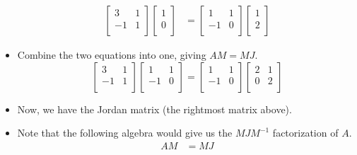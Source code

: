 \documentclass{article}
\begin{document}
\begin{itemize}
\begin{align*}
        \begin{bmatrix}
            3 & 1\\
            -1 & 1\\
        \end{bmatrix}
        \begin{bmatrix}
            1\\
            0\\
        \end{bmatrix}
        &=
        \begin{bmatrix}
            1 & 1\\
            -1 & 0\\
        \end{bmatrix}
        \begin{bmatrix}
            1\\
            2\\
        \end{bmatrix}
    \end{align*}
    \item Combine the two equations into one, giving $AM=MJ$.
    \begin{equation*}
        \begin{bmatrix}
            3 & 1\\
            -1 & 1\\
        \end{bmatrix}
        \begin{bmatrix}
            1 & 1\\
            -1 & 0\\
        \end{bmatrix}
        =
        \begin{bmatrix}
            1 & 1\\
            -1 & 0\\
        \end{bmatrix}
        \begin{bmatrix}
            2 & 1\\
            0 & 2\\
        \end{bmatrix}
    \end{equation*}
    \item Now, we have the Jordan matrix (the rightmost matrix above).
    \item Note that the following algebra would give us the $MJM^{-1}$ factorization of $A$.
    \begin{align*}
        AM &= MJ\\

\end{align*}
\end{itemize}
\end{document}
